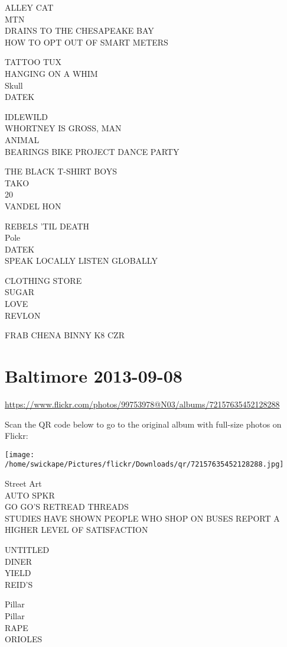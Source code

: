 \documentclass[10pt,letterpaper]{article}
\begin{document}
ALLEY CAT\\
MTN\\
DRAINS TO THE CHESAPEAKE BAY\\
HOW TO OPT OUT OF SMART METERS

TATTOO TUX\\
HANGING ON A WHIM\\
Skull\\
DATEK

IDLEWILD\\
WHORTNEY IS GROSS, MAN\\
ANIMAL\\
BEARINGS BIKE PROJECT DANCE PARTY

THE BLACK T{-}SHIRT BOYS\\
TAKO\\
20\\
VANDEL HON

REBELS 'TIL DEATH\\
Pole\\
DATEK\\
SPEAK LOCALLY LISTEN GLOBALLY

CLOTHING STORE\\
SUGAR\\
LOVE\\
REVLON

FRAB CHENA BINNY K8 CZR


\section*{Baltimore 2013-09-08}

\url{https://www.flickr.com/photos/99753978@N03/albums/72157635452128288}

Scan the QR code below to go to the original album with full-size photos on Flickr:

\texttt{[image: /home/swickape/Pictures/flickr/Downloads/qr/72157635452128288.jpg]}


Street Art\\
AUTO SPKR\\
GO GO'S RETREAD THREADS\\
STUDIES HAVE SHOWN PEOPLE WHO SHOP ON BUSES REPORT A HIGHER LEVEL OF SATISFACTION

UNTITLED\\
DINER\\
YIELD\\
REID'S

Pillar\\
Pillar\\
RAPE\\
ORIOLES
\end{document}

